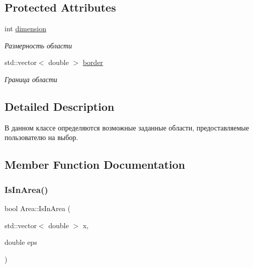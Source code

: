 \subsection*{Protected Attributes}
\begin{DoxyCompactItemize}
\item 
\mbox{\label{class_area_a4ec26baccd65af0189a9c8c25ab86ec3}} 
int \mbox{\hyperlink{class_area_a4ec26baccd65af0189a9c8c25ab86ec3}{dimension}}
\begin{DoxyCompactList}\small\item\em Размерность области \end{DoxyCompactList}\item 
\mbox{\label{class_area_abfef011384225390a16165cd89f5d69d}} 
std\+::vector$<$ double $>$ \mbox{\hyperlink{class_area_abfef011384225390a16165cd89f5d69d}{border}}
\begin{DoxyCompactList}\small\item\em Граница области \end{DoxyCompactList}\end{DoxyCompactItemize}


\subsection{Detailed Description}
В данном классе определяются возможные заданные области, предоставляемые пользователю на выбор. 

\subsection{Member Function Documentation}
\mbox{\label{class_area_a51d5a60d36a0fd4c45eb374eea1bc976}} 
\subsubsection{\texorpdfstring{Is\+In\+Area()}{IsInArea()}}
{\footnotesize\ttfamily bool Area\+::\+Is\+In\+Area (\begin{DoxyParamCaption}\item[{std\+::vector$<$ double $>$}]{x,  }\item[{double}]{eps }\end{DoxyParamCaption})}


